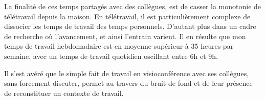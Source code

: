La finalité de ces temps partagés avec des collègues, est de casser la monotonie de télétravail depuis la maison. En télétravail, il est particulièrement complexe de dissocier les temps de travail des temps personnels. D'autant plus dans un cadre de recherche où l'avancement, et ainsi l'entrain varient. Il en résulte que mon temps de travail hebdomadaire est en moyenne supérieur à 35 heures par semaine, avec un temps de travail quotidien oscillant entre 6h et 9h.

Il s'est avéré que le simple fait de travail en visioconférence avec ses collègues, sans forcement discuter, permet au travers du bruit de fond et de leur présence de reconstituer un contexte de travail.
